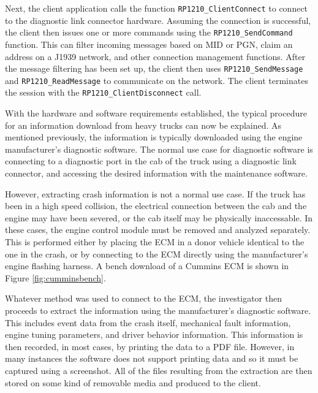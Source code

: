 Next, the client application calls the function \texttt{RP1210\_ClientConnect} to connect to the diagnostic link connector hardware. Assuming
the connection is successful, the client then issues one or more commands using the \texttt{RP1210\_SendCommand} function. This can filter incoming
messages based on MID or PGN, claim an address on a J1939 network, and other connection management functions. After the message filtering has been
set up, the client then uses \texttt{RP1210\_SendMessage} and \texttt{RP1210\_ReadMessage} to communicate on the network. The client terminates
the session with the \texttt{RP1210\_ClientDisconnect} call.


With the hardware and software requirements established, the typical procedure for an information download from heavy trucks can now be explained.
As mentioned previously, the information is typically downloaded using the engine manufacturer's diagnostic software. The normal use case
for diagnostic software is connecting to a diagnostic port in the cab of the truck using a diagnostic link connector, and accessing the desired
information with the maintenance software.

However, extracting crash information is not a normal use case. If the truck has been in a high speed collision, the electrical connection
between the cab and the engine may have been severed, or the cab itself may be physically inaccessable. In these cases, the engine control module
must be removed and analyzed separately. This is performed either by placing the ECM in a donor vehicle identical to the one in the crash, or
by connecting to the ECM directly using the manufacturer's engine flashing harness. A bench download of a Cummins ECM is shown in Figure \ref{fig:cumminsbench}.

Whatever method was used to connect to the ECM, the investigator then proceeds to extract the information using the manufacturer's diagnostic
software. This includes event data from the crash itself, mechanical fault information, engine tuning parameters, and driver behavior information.
This information is then recorded, in most cases, by printing the data to a PDF file. However, in many instances the software does not support
printing data and so it must be captured using a screenshot. All of the files resulting from the extraction are then stored on some kind of
removable media and produced to the client.


